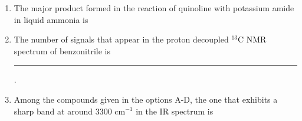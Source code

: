 \documentclass[journal,12pt,onecolumn]{IEEEtran}
\theoremstyle{remark}
\begin{document}
\begin{enumerate}
\item The major product formed in the reaction of quinoline with potassium amide  in liquid ammonia is
    \begin{enumerate}
        \hfill{}
    \end{enumerate}



\item The number of signals that appear in the proton decoupled $^{13}$C NMR spectrum of benzonitrile  is \rule{1cm}{0.15mm}.
\hfill{}



\item Among the compounds given in the options A-D, the one that exhibits a sharp band at around $3300\text{ cm}^{-1}$ in the IR spectrum is
    \begin{enumerate}
        \hfill{}
    \end{enumerate}



\end{enumerate}
\end{document}
